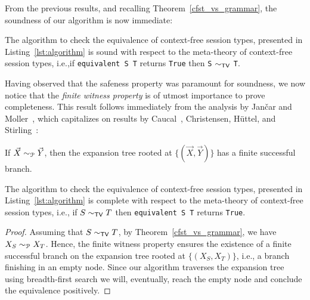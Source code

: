 From the previous results, and recalling Theorem~\ref{cfst_vs_grammar},
the soundness of our algorithm is now immediate:

\begin{theorem}
	The algorithm to check the equivalence of context-free session types,
	presented in Listing~\ref{lst:algorithm} is sound with respect to the
	meta-theory of context-free session types, i.e.,\linebreak if
	\lstinline|equivalent S T| returns
	\lstinline|True| then \lstinline|S| $\sim_{\mathsf{TV}}$ \lstinline|T|.
\end{theorem}

Having observed that the safeness property was paramount for soundness,
we now notice that the \emph{finite witness property} is of utmost
importance to prove completeness. This result follows immediately from the
 analysis by Jan{\v{c}}ar and Moller~\cite{janvcar1999techniques}, which
 capitalizes on results by
Caucal~\cite{caucal1986decidabilite}, Christensen, H{\"{u}}ttel, and
Stirling~\cite{DBLP:journals/iandc/ChristensenHS95}:

\begin{proposition} 
\label{finite_witness}
	If $\vec X \sim_{\mathcal{P}} \vec Y$, then the expansion tree rooted at
	$\{(\vec X, \vec Y)\}$ has a finite successful branch.
\end{proposition}



\begin{theorem}
	The algorithm to check the equivalence of context-free session types,
	presented in Listing~\ref{lst:algorithm} is complete with respect to the
	meta-theory of context-free session types, i.e., \linebreak if
	$S \sim_{\mathsf{TV}} T$ then
	\lstinline|equivalent S T| returns \lstinline|True|.
\end{theorem}

\begin{proof}
	Assuming that $S \sim_{\mathsf{TV}} T$, by
	Theorem~\ref{cfst_vs_grammar}, we
	have $X_{S} \sim_{\mathcal{P}} X_{T}$.
	Hence, the finite witness property
	ensures the existence of a finite successful branch on the expansion
	tree rooted at $\{(X_{S},X_{T})\}$,
	i.e., a branch finishing in an empty node.
	Since our algorithm traverses
	the expansion tree using breadth-first search we will, eventually,
	reach the empty node and conclude the equivalence positively.
\end{proof}
